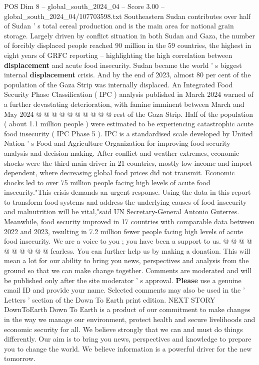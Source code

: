 \begin{textsample}{POS Dim 8 – global\_south\_2024\_04 – Score 3.00 – global\_south\_2024\_04/107703598.txt}
Southeastern Sudan contributes over half of Sudan ' s total cereal production and is the main area for national grain storage.
Largely driven by conflict situation in both Sudan and Gaza, the number of forcibly displaced people reached 90 million in the 59 countries, the highest in eight years of GRFC reporting -- highlighting the high correlation between \textbf{displacement} and acute food insecurity.
Sudan became the world ' s biggest internal \textbf{displacement} crisis.
And by the end of 2023, almost 80 per cent of the population of the Gaza Strip was internally displaced.
An Integrated Food Security Phase Classification ( IPC ) analysis published in March 2024 warned of a further devastating deterioration, with famine imminent between March and May 2024 @ @ @ @ @ @ @ @ @ @ rest of the Gaza Strip.
Half of the population ( about 1.1 million people ) were estimated to be experiencing catastrophic acute food insecurity ( IPC Phase 5 ).
IPC is a standardised scale developed by United Nation ' s Food and Agriculture Organization for improving food security analysis and decision making.
After conflict and weather extremes, economic shocks were the third main driver in 21 countries, mostly low-income and import-dependent, where decreasing global food prices did not transmit.
Economic shocks led to over 75 million people facing high levels of acute food insecurity."This crisis demands an urgent response.
Using the data in this report to transform food systems and address the underlying causes of food insecurity and malnutrition will be vital,"said UN Secretary-General Antonio Guterres.
Meanwhile, food security improved in 17 countries with comparable data between 2022 and 2023, resulting in 7.2 million fewer people facing high levels of acute food insecurity.
We are a voice to you ; you have been a support to us. @ @ @ @ @ @ @ @ @ @ fearless.
You can further help us by making a donation.
This will mean a lot for our ability to bring you news, perspectives and analysis from the ground so that we can make change together.
Comments are moderated and will be published only after the site moderator ' s approval. \textbf{Please} use a genuine email ID and provide your name.
Selected comments may also be used in the ' Letters ' section of the Down To Earth print edition.
NEXT STORY DownToEarth Down To Earth is a product of our commitment to make changes in the way we manage our environment, protect health and secure livelihoods and economic security for all.
We believe strongly that we can and must do things differently.
Our aim is to bring you news, perspectives and knowledge to prepare you to change the world.
We believe information is a powerful driver for the new tomorrow.

\end{textsample}
